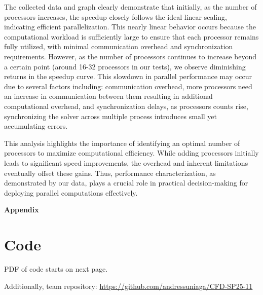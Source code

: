 \documentclass[11pt]{article}
\begin{document}
The collected data and graph clearly demonstrate that initially, as the number of processors increases, the speedup closely follows the ideal linear scaling, indicating efficient parallelization. This nearly linear behavior occurs because the computational workload is sufficiently large to ensure that each processor remains fully utilized, with minimal communication overhead and synchronization requirements. 
However, as the number of processors continues to increase beyond a certain point (around 16-32 processors in our tests), we observe diminishing returns in the speedup curve. This slowdown in parallel performance may occur due to several factors including: communication overhead, more processors need an increase in communication between them resulting in additional computational overhead, and synchronization delays, as processors counts rise, synchronizing the solver across multiple process introduces small yet accumulating errors.
\vspace{3mm}

This analysis highlights the importance of identifying an optimal number of processors to maximize computational efficiency. While adding processors initially leads to significant speed improvements, the overhead and inherent limitations eventually offset these gains. Thus, performance characterization, as demonstrated by our data, plays a crucial role in practical decision-making for deploying parallel computations effectively.

\pagebreak
\appendix
{} 
\begin{center}
\vspace*{\fill}
   \Huge \bf Appendix 
\vspace*{\fill}
\end{center}
\pagebreak 

\hypertarget{code}{}
\section{Code}
PDF of code starts on next page. 
\vspace{2.5mm}

Additionally, team repository: \url{https://github.com/andressuniaga/CFD-SP25-11}


\end{document}
